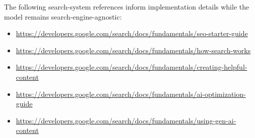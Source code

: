 \documentclass{article}
\begin{document}
The following search-system references inform implementation details while the model remains search-engine-agnostic:
\begin{itemize}
    \item \url{https://developers.google.com/search/docs/fundamentals/seo-starter-guide}
    \item \url{https://developers.google.com/search/docs/fundamentals/how-search-works}
    \item \url{https://developers.google.com/search/docs/fundamentals/creating-helpful-content}
    \item \url{https://developers.google.com/search/docs/fundamentals/ai-optimization-guide}
    \item \url{https://developers.google.com/search/docs/fundamentals/using-gen-ai-content}
\end{itemize}


% 
\end{document}
